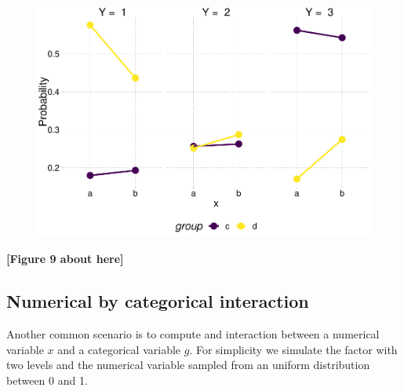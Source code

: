 \documentclass[
  man,floatsintext]{apa6}
\begin{document}
\scriptsize

\begin{figure}

{\centering \includegraphics{paper-new_files/figure-latex/fig-effects-2-by-2-interaction-1} 

}

\caption{ }\label{fig:fig-effects-2-by-2-interaction}
\end{figure}

\begin{center}\textbf{[Figure 9 about here]} \end{center}

\normalsize

\subsection{Numerical by categorical interaction}\label{numerical-by-categorical-interaction}

Another common scenario is to compute and interaction between a numerical variable \(x\) and a categorical variable \(g\). For simplicity we simulate the factor with two levels and the numerical variable sampled from an uniform distribution between 0 and 1.

\scriptsize
\end{document}
